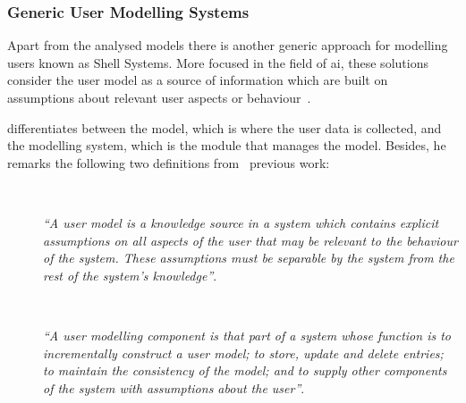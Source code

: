 
\subsubsection{Generic User Modelling Systems}
\label{sec:generic_users}

Apart from the analysed models there is another generic approach for modelling 
users known as Shell Systems. More focused in the field of \ac{ai}, these 
solutions consider the user model as a source of information which are built on 
assumptions about relevant user aspects or 
behaviour~\citep{pohl_logic_based_1999}.

\citet{heckmann_ubiquitous_2005} differentiates between the model, which is where 
the user data is collected, and the modelling system, which is the module that
manages the model. Besides, he remarks the following two definitions
from~\citet{wahlster1989user} previous work:

\begin{description}
  \item[] \hfill \\
  \begin{mdframed}[hidealllines=true,backgroundcolor=gray!20]
  \textit{``A user model is a knowledge source in a system which contains explicit
  assumptions on all aspects of the user that may be relevant to the behaviour
  of the system. These assumptions must be separable by the system from the
  rest of the system's knowledge''}.
  \end{mdframed}

  \item[] \hfill \\
  \begin{mdframed}[hidealllines=true,backgroundcolor=gray!20]
  \textit{``A user modelling component is that part of a system whose function is to
  incrementally construct a user model; to store, update and delete entries;
  to maintain the consistency of the model; and to supply other components of
  the system with assumptions about the user''}.
  \end{mdframed}
  
\end{description}


